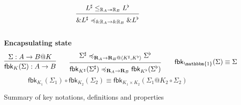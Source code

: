 \documentclass[acmsmall,screen,review,anonymous]{acmart}
\newcommand{\kw}[1]{\ensuremath{ \mathsf{#1} }}
\renewcommand{\preceq}{\preccurlyeq}
\begin{document}
\begin{figure}[h]
\[\begin{prooftree}
      \hypo{L^\sharp
        \le_{\mathbb{R}_A \twoheadrightarrow \mathbb{R}_B}
        L^\flat}
      \infer1{\&L^\sharp
        \preceq_{\&\mathbb{R}_A \rightarrow \&\mathbb{R}_B}
        \&L^\flat}
    \end{prooftree}
  \]
  \\[1em]
  \textbf{Encapsulating state}
  \[
    \begin{prooftree}
      \hypo{\Sigma : A \rightarrow B@K}
      \infer1{\kw{fbk}_K(\Sigma) : A \rightarrow B}
    \end{prooftree}
    \qquad
    \begin{prooftree}
      \hypo{\Sigma^\sharp
        \preceq_{\mathbf{R}_A \rightarrow
                 \mathbf{R}_B@\langle K^\sharp,K^\flat \rangle}
        \Sigma^\flat}
      \infer1{\kw{fbk}_{K^\sharp}(\Sigma^\sharp)
        \preceq_{\mathbf{R}_A \rightarrow \mathbf{R}_B}
        \kw{fbk}_{K^\flat}(\Sigma^\flat)}
    \end{prooftree}
    \qquad
    \kw{fbk}_\mathbbm{1}(\Sigma) \equiv \Sigma
  \]
  \vspace{1ex}
  \[
    \kw{fbk}_{K_1}(\Sigma_1) \circ \kw{fbk}_{K_2}(\Sigma_2) \equiv
    \kw{fbk}_{K_1 \times K_2}(\Sigma_1@K_2 \circ \Sigma_2)
  \]
  \caption{Summary of key notations, definitions and properties}
  \label{fig:overview}
\end{figure}

\tableofcontents
\end{document}

